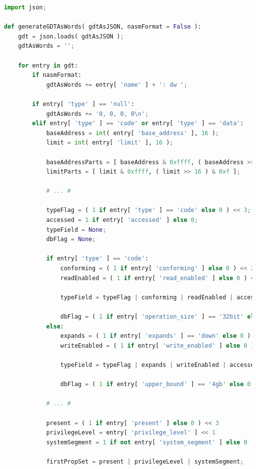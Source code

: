 \begin{lstlisting}[language=Python]
import json;

def generateGDTAsWords( gdtAsJSON, nasmFormat = False ):
    gdt = json.loads( gdtAsJSON );
    gdtAsWords = '';
    
    for entry in gdt:
        if nasmFormat:
            gdtAsWords += entry[ 'name' ] + ': dw ';
                
        if entry[ 'type' ] == 'null':
            gdtAsWords += '0, 0, 0, 0\n';
        elif entry[ 'type' ] == 'code' or entry[ 'type' ] == 'data':
            baseAddress = int( entry[ 'base_address' ], 16 );
            limit = int( entry[ 'limit' ], 16 );
            
            baseAddressParts = [ baseAddress & 0xffff, ( baseAddress >> 16 ) & 0xff, ( baseAddress >> 24 ) & 0xff ]
            limitParts = [ limit & 0xffff, ( limit >> 16 ) & 0xf ];
            
            # ... #
            
            typeFlag = ( 1 if entry[ 'type' ] == 'code' else 0 ) << 3;
            accessed = 1 if entry[ 'accessed' ] else 0;
            typeField = None;
            dbFlag = None;
            
            if entry[ 'type' ] == 'code':
                conforming = ( 1 if entry[ 'conforming' ] else 0 ) << 2;
                readEnabled = ( 1 if entry[ 'read_enabled' ] else 0 ) << 1;
                
                typeField = typeFlag | conforming | readEnabled | accessed;
                
                dbFlag = ( 1 if entry[ 'operation_size' ] == '32bit' else 0 ) << 2
            else:
                expands = ( 1 if entry[ 'expands' ] == 'down' else 0 ) << 2;
                writeEnabled = ( 1 if entry[ 'write_enabled' ] else 0 ) << 1;
                
                typeField = typeFlag | expands | writeEnabled | accessed;
                
                dbFlag = ( 1 if entry[ 'upper_bound' ] == '4gb' else 0 ) << 2
                
            # ... #
            
            present = ( 1 if entry[ 'present' ] else 0 ) << 3
            privilegeLevel = entry[ 'privilege_level' ] << 1
            systemSegment = 1 if not entry[ 'system_segment' ] else 0
            
            firstPropSet = present | privilegeLevel | systemSegment;
            

\end{lstlisting}
